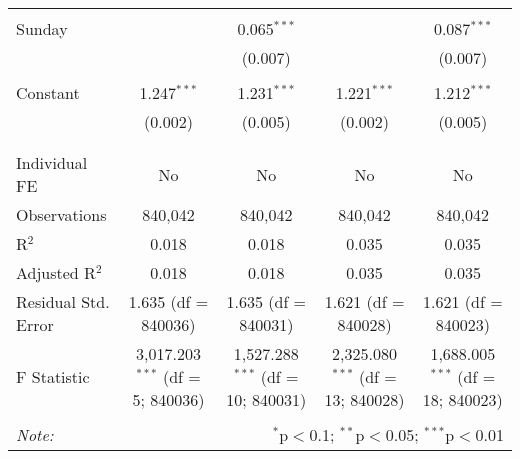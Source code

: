 \documentclass[
]{article}
\begin{document}
\begin{table}[!htbp]
{\begin{tabular}{@{\extracolsep{5pt}}lcccc}
  & & & & \\ 
 Sunday &  & 0.065$^{***}$ &  & 0.087$^{***}$ \\ 
  &  & (0.007) &  & (0.007) \\ 
  & & & & \\ 
 Constant & 1.247$^{***}$ & 1.231$^{***}$ & 1.221$^{***}$ & 1.212$^{***}$ \\ 
  & (0.002) & (0.005) & (0.002) & (0.005) \\ 
  & & & & \\ 
\hline \\[-1.8ex] 
Individual FE & No & No & No & No \\ 
Observations & 840,042 & 840,042 & 840,042 & 840,042 \\ 
R$^{2}$ & 0.018 & 0.018 & 0.035 & 0.035 \\ 
Adjusted R$^{2}$ & 0.018 & 0.018 & 0.035 & 0.035 \\ 
Residual Std. Error & 1.635 (df = 840036) & 1.635 (df = 840031) & 1.621 (df = 840028) & 1.621 (df = 840023) \\ 
F Statistic & 3,017.203$^{***}$ (df = 5; 840036) & 1,527.288$^{***}$ (df = 10; 840031) & 2,325.080$^{***}$ (df = 13; 840028) & 1,688.005$^{***}$ (df = 18; 840023) \\ 
\hline 
\hline \\[-1.8ex] 
\textit{Note:}  & \multicolumn{4}{r}{$^{*}$p$<$0.1; $^{**}$p$<$0.05; $^{***}$p$<$0.01} \\ 
\end{tabular}
} 
\end{table} 
\newpage
\end{document}
